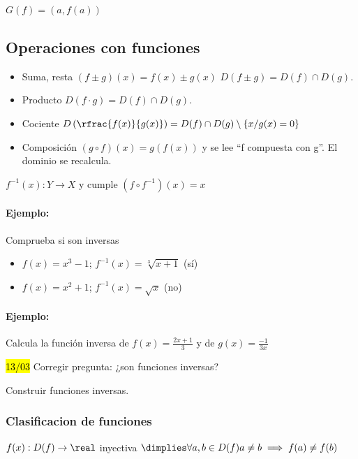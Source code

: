\documentclass[palatino,nosec]{Docencia}
\begin{document}
 $G(f) = {\left(a,f(a)\right)}$

\subsection{Operaciones con funciones}
\begin{itemize}
	\item Suma, resta $(f\pm g)(x) = f(x) \pm g(x)$
	\subitem $D(f\pm g) = D(f)\cap D(g)$.
	\item Producto
	\subitem $D(f·g) = D(f)\cap D(g)$.
	\item Cociente 
	\subitem $D\left(\rfrac{f(x)}{g(x)}\right) = D(f)\cap D(g) \setminus \{x/g(x) = 0\}$
	\item Composición $(g\circ f)(x) = g\left(f(x)\right)$ y se lee ``f compuesta con g''.
	\subitem El dominio se recalcula.
\end{itemize}

 $f^{-1}(x):Y\to X$ y cumple $(f\circ f^{-1})(x) = x$

\paragraph{Ejemplo:} Comprueba si son inversas
\begin{itemize}
	\item $f(x) = x^3-1$; $f^{-1}(x) = \sqrt[3]{x+1}$ (sí)
	\item $f(x) = x^2+1$; $f^{-1}(x) = \sqrt{x}$ (no)
\end{itemize}

\paragraph{Ejemplo:} Calcula la función inversa de $f(x) = \frac{2x+1}{3}$ y de $g(x) = \frac{-1}{3x}$ 

\hl{13/03} Corregir pregunta: ¿son funciones inversas?

Construir funciones inversas.

\subsubsection{Clasificacion de funciones}

\begin{defn}[Inyectividad]
$f(x) : D(f) \to \real$ inyectiva $\dimplies\forall a,b\in D(f) a\neq b \implies f(a) \neq f(b)$
\end{defn} 
\end{document}
